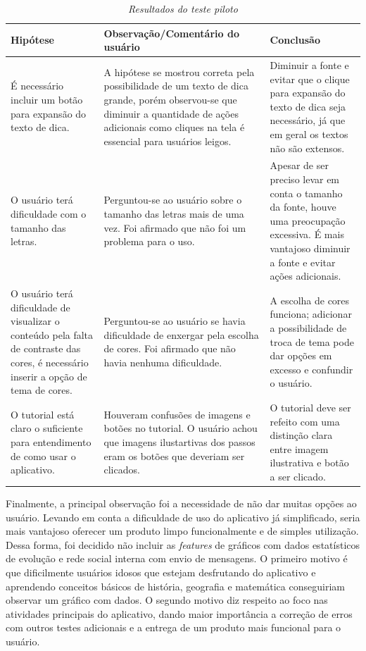 \begin{table}[H]
\centering
\caption{\textit{Resultados do teste piloto}}
\centering
\footnotesize
\begin{tabular}{p{5cm} p{5cm} p{5cm}}
\toprule
\textbf{Hipótese} & \textbf{Observação/Comentário do usuário} & \textbf{Conclusão}                                   
\\ \midrule
É necessário incluir um botão para expansão 
do texto de dica.
& 
A hipótese se mostrou correta pela possibilidade de um texto de dica grande, porém observou-se que diminuir a quantidade de ações adicionais como cliques na tela é essencial para usuários leigos.
&
Diminuir a fonte e evitar que o clique para expansão do texto de dica seja necessário, já que em geral os textos não são extensos.
\\ \midrule
O usuário terá dificuldade com o tamanho das letras.
& 
Perguntou-se ao usuário sobre o tamanho das letras mais de uma vez. Foi afirmado que não foi um problema para o uso.
&
Apesar de ser preciso levar em conta o tamanho da fonte, houve uma preocupação excessiva. 
É mais vantajoso diminuir a fonte e evitar ações adicionais.
\\ \midrule
O usuário terá dificuldade de visualizar o 
conteúdo pela falta de contraste das cores, é necessário inserir a opção de tema de cores.
& 
Perguntou-se ao usuário se havia dificuldade de enxergar pela escolha de cores. Foi afirmado que não havia nenhuma dificuldade.
&
A escolha de cores funciona; adicionar a possibilidade de troca de tema pode dar opções em excesso e
 confundir o usuário.
\\ \midrule
O tutorial está claro o suficiente para entendimento de como usar o aplicativo.
&
Houveram confusões de imagens e botões
no tutorial. O usuário achou que imagens 
ilustartivas dos passos eram os botões que 
deveriam ser clicados.
&
O tutorial deve ser refeito com uma distinção clara entre imagem ilustrativa e botão a ser clicado.
\\ \midrule
\end{tabular}
\label{tab:feedback-teste-piloto}
\end{table}

Finalmente, a principal observação foi a necessidade de não dar muitas opções ao usuário. Levando em conta a dificuldade de uso do aplicativo já simplificado, seria mais vantajoso oferecer um produto limpo funcionalmente e de simples utilização. Dessa forma, foi decidido não incluir as \textit{features} de gráficos com 
dados estatísticos de evolução e rede social interna
com envio de mensagens. O primeiro motivo é que dificilmente
usuários idosos que estejam desfrutando do aplicativo e 
aprendendo conceitos básicos de história, geografia e
matemática conseguiriam observar um gráfico com dados.
O segundo motivo diz respeito ao foco nas atividades principais do aplicativo, dando maior importância a correção de erros com outros testes adicionais e a entrega de um produto mais funcional para o usuário. 

